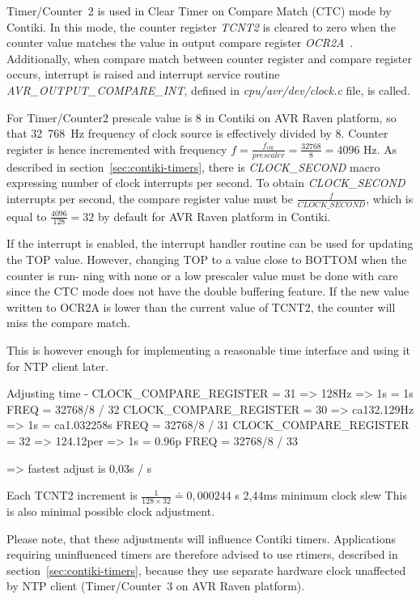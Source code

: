 Timer/Counter~2 is used in Clear Timer on Compare Match (CTC) mode by Contiki.
In this mode, the counter register {\it{TCNT2}} is cleared to zero when the counter
value matches the value in output compare register {\it{OCR2A}}~\cite{avr-datasheet}.
Additionally, when compare match between counter register and compare register occurs,
interrupt is raised and interrupt service routine {\it{AVR\_OUTPUT\_COMPARE\_INT}},
defined in {\it{cpu/avr/dev/clock.c}} file, is called.


For Timer/Counter2 prescale value is 8 in Contiki on AVR Raven platform,
so that 32~768~Hz frequency of clock source is effectively divided by 8.
Counter register is hence incremented with frequency
$f = {\frac{f_{clk}}{prescaler}} = {\frac{32768}{8}} = 4096$ Hz.
As described in section~\ref{sec:contiki-timers}, there is
{\it{CLOCK\_SECOND}} macro expressing number of clock interrupts per second.
To obtain {\it{CLOCK\_SECOND}} interrupts per second, the compare register value
must be ${\frac{f}{CLOCK\_SECOND}}$, which is equal to ${\frac{4096}{128}} = 32$
by default for AVR Raven platform in Contiki.

If the interrupt is enabled, the interrupt handler routine can be used for updating
the TOP value. However, changing TOP to a value close to BOTTOM when the counter is run-
ning with none or a low prescaler value must be done with care since the CTC mode does not
have the double buffering feature. If the new value written to OCR2A is lower than the current
value of TCNT2, the counter will miss the compare match.



This is however enough for implementing a reasonable time interface and using it for NTP client later.



Adjusting time - CLOCK\_COMPARE\_REGISTER = 31 => 128Hz => 1s = 1s
FREQ = 32768/8 / 32
CLOCK\_COMPARE\_REGISTER = 30 => ca132.129Hz => 1s = ca1.032258s
FREQ = 32768/8 / 31
CLOCK\_COMPARE\_REGISTER = 32 => 124.12per => 1s = 0.96p
FREQ = 32768/8 / 33

=> fastest adjust is 0,03s / s


Each TCNT2 increment is $\frac{1}{128 \times 32} \doteq 0,000244$ s
2,44ms minimum clock slew
This is also minimal possible clock adjustment.


Please note, that these adjustments will influence Contiki timers.
Applications requiring uninfluenced timers
are therefore advised to use rtimers, described in section~\ref{sec:contiki-timers},
because they use separate hardware clock unaffected by NTP client
(Timer/Counter~3 on AVR Raven platform).
